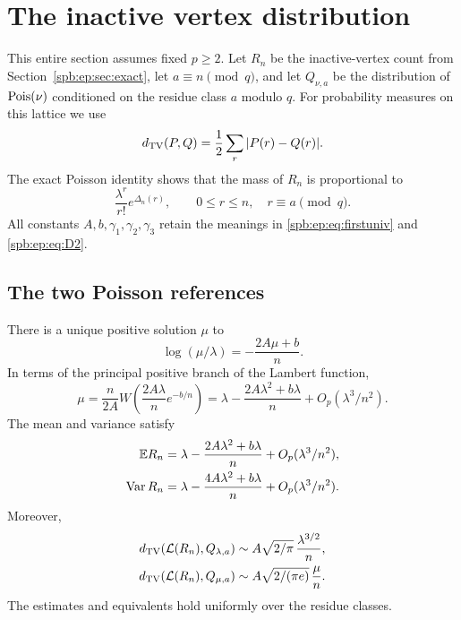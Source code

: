 \section{The inactive vertex distribution}
\label{spb:ep:sec:marked}
This entire section assumes fixed $p\ge2$.
Let $R_n$ be the inactive-vertex count from Section~\ref{spb:ep:sec:exact}, let
$a\equiv n\pmod q$, and let $Q_{\nu,a}$ be the distribution of
$\operatorname{Pois}(\nu)$ conditioned on the residue class $a$ modulo $q$.
For probability measures on this lattice we use
\[
 d_{\mathrm{TV}}(P,Q)=\frac12\sum_r|P(r)-Q(r)|.
\]
The exact Poisson identity shows that the mass of $R_n$ is proportional to
\begin{equation}\label{spb:ep:eq:markedweight}
 \frac{\lambda^r}{r!}e^{\Delta_n(r)},
 \qquad 0\le r\le n,\quad r\equiv a\pmod q.
\end{equation}
All constants $A,b,\gamma_1,\gamma_2,\gamma_3$ retain the meanings in
\eqref{spb:ep:eq:firstuniv} and \eqref{spb:ep:eq:D2}.

\subsection{The two Poisson references}
\begin{theorem}\label{spb:ep:thm:markedmain}
There is a unique positive solution $\mu$ to
\begin{equation}\label{spb:ep:eq:mu}
 \log(\mu/\lambda)=-\frac{2A\mu+b}{n}.
\end{equation}
In terms of the principal positive branch of the Lambert function,
\begin{equation}\label{spb:ep:eq:muW}
 \mu=\frac{n}{2A}W\left(\frac{2A\lambda}{n}e^{-b/n}\right)
 =\lambda-\frac{2A\lambda^2+b\lambda}{n}
                   +O_p(\lambda^3/n^2).
\end{equation}
The mean and variance satisfy
\begin{align}
 \mathbb E R_n&=\lambda-\frac{2A\lambda^2+b\lambda}{n}
                      +O_p(\lambda^3/n^2),\label{spb:ep:eq:mean}\\
 \operatorname{Var} R_n&=\lambda-\frac{4A\lambda^2+b\lambda}{n}
                      +O_p(\lambda^3/n^2).\label{spb:ep:eq:variance}
\end{align}
Moreover,
\begin{align}
 d_{\mathrm{TV}}(\mathcal L(R_n),Q_{\lambda,a})
       &\sim A\sqrt{2/\pi}\,\frac{\lambda^{3/2}}{n},\label{spb:ep:eq:TVlambda}\\
 d_{\mathrm{TV}}(\mathcal L(R_n),Q_{\mu,a})
       &\sim A\sqrt{2/(\pi e)}\,\frac{\mu}{n}.\label{spb:ep:eq:TVmu}
\end{align}
The estimates and equivalents hold uniformly over the residue classes.
\end{theorem}

